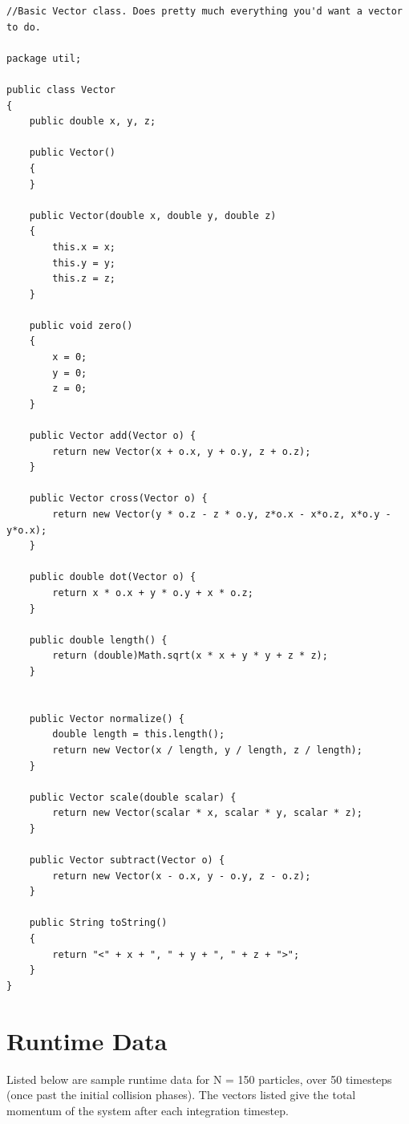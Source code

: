 \documentclass[10pt]{article}
\begin{document}
\begin{verbatim}
//Basic Vector class. Does pretty much everything you'd want a vector to do.

package util;

public class Vector 
{
	public double x, y, z;
	
	public Vector() 
	{
	}
	
	public Vector(double x, double y, double z) 
	{
		this.x = x;
		this.y = y;
		this.z = z;
	}
	
	public void zero()
	{
		x = 0;
		y = 0;
		z = 0;
	}
	
	public Vector add(Vector o) {
		return new Vector(x + o.x, y + o.y, z + o.z);
	}
	
	public Vector cross(Vector o) {
		return new Vector(y * o.z - z * o.y, z*o.x - x*o.z, x*o.y - y*o.x);
	}
	
	public double dot(Vector o) {
		return x * o.x + y * o.y + x * o.z;
	}
	
	public double length() {
		return (double)Math.sqrt(x * x + y * y + z * z);
	}
	
	
	public Vector normalize() {
		double length = this.length();
		return new Vector(x / length, y / length, z / length);
	}
	
	public Vector scale(double scalar) {
		return new Vector(scalar * x, scalar * y, scalar * z);
	}
	
	public Vector subtract(Vector o) {
		return new Vector(x - o.x, y - o.y, z - o.z);
	}
	
	public String toString()
	{
		return "<" + x + ", " + y + ", " + z + ">";
	}
}

\end{verbatim}

\clearpage
\small
\section{Runtime Data}
Listed below are sample runtime data for N = 150 particles, over 50 timesteps (once past the initial collision phases). 
The vectors listed give the total momentum of the system after each integration timestep.
\end{document}
